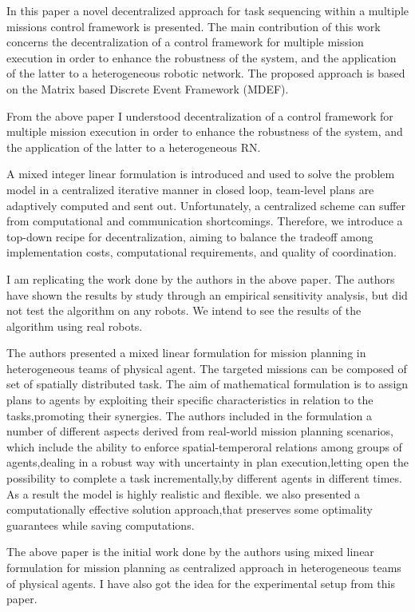 \documentclass[conference]{IEEEtran}
\begin{document}
In this paper a novel decentralized approach for task sequencing within a multiple missions control framework is presented. The main contribution of this work concerns the decentralization of a control framework for multiple mission execution in order to enhance the robustness of the system, and the application of the latter to a heterogeneous robotic network. The proposed approach is based on the Matrix based Discrete Event Framework (MDEF)\cite{di2011decentralized}.

From the above paper I understood decentralization of a control framework for multiple mission execution in order to enhance the robustness of the system, and the application of the latter to a heterogeneous RN.

A mixed integer linear formulation is introduced and used to solve the problem model in a centralized iterative manner in closed loop, team-level plans are adaptively computed and sent out. Unfortunately, a centralized scheme can suffer from computational and communication shortcomings. Therefore, we introduce a top-down recipe for decentralization, aiming to balance the tradeoff among implementation costs, computational requirements, and quality of coordination\cite{feo2016decentralized}.

I am replicating the work done by the authors in the above paper. The authors have shown the results by study through an empirical sensitivity analysis, but did not test the algorithm on any robots. We intend to see the results of the algorithm using real robots.

The authors presented a mixed linear formulation for mission planning in heterogeneous teams of physical agent. The targeted missions can be composed of set of spatially distributed task. The aim of mathematical formulation is to assign plans to agents by exploiting their specific characteristics in relation to the tasks,promoting their synergies. The authors included in the formulation a number of different aspects derived from real-world mission planning scenarios, which include the ability to enforce spatial-temperoral relations among groups of agents,dealing in a robust way with uncertainty in plan execution,letting open the possibility to complete a task incrementally,by different agents in different times. As a result the model is highly realistic and flexible. we also presented a computationally effective solution approach,that preserves some optimality guarantees while saving computations\cite{flushing2014mathematical}.

The above paper is the initial work done by the authors using mixed linear formulation for mission planning as centralized approach in heterogeneous teams of physical agents. I have also got the idea for the experimental setup from this paper.
\end{document}

